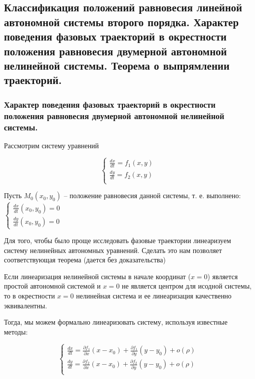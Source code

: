 \documentclass[a4paper, 12pt]{article}
\begin{document}
    \subsection{Классификация положений равновесия линейной
    автономной системы второго порядка. Характер поведения фазовых траекторий в окрестности положения равновесия двумерной автономной нелинейной системы. Теорема о выпрямлении траекторий.}

    \subsubsection{Характер поведения фазовых траекторий в окрестности положения равновесия двумерной автономной нелинейной системы.}

    Рассмотрим систему уравнений

    \begin{equation}
      \begin{cases}
        \frac{d x}{d t} = f_1 (x, y) \\
        \frac{d y}{d t} = f_2 (x, y) \\
      \end{cases} 
    \end{equation}

    Пусть $M_0(x_0, y_0)$ -- положение равновесия данной системы, т. е. выполнено:
    $\begin{cases}
      \frac{d x}{d t}(x_0, y_0) = 0 \\
      \frac{d y}{d t}(x_0, y_0) = 0
    \end{cases}$

    Для того, чтобы было проще исследовать фазовые траектории линеаризуем систему нелинейных автономных уравнений. Сделать это нам позволяет соответствующая теорема (дается без доказательства)

    \begin{theorem}
      Если линеаризация нелинейной системы в начале координат ($x = 0$) является простой автономной системой и $x = 0$ не является центром для исодной системы, то в окрестности $x = 0$ нелинейная система и ее линеаризация качественно эквивалентны.
    \end{theorem}

    Тогда, мы можем формально линеаризовать систему, используя известные методы:

    \begin{equation}
      \begin{cases}
        \frac{d x}{d t} = \frac{\partial f_1}{\partial x} (x - x_0) + \frac{\partial f_1}{\partial y} (y - y_0) + o(\rho) \\
        \frac{d y}{d t} = \frac{\partial f_2}{\partial x} (x - x_0) + \frac{\partial f_2}{\partial y} (y - y_0) + o(\rho) \\        
      \end{cases}
    \end{equation}
\end{document}
